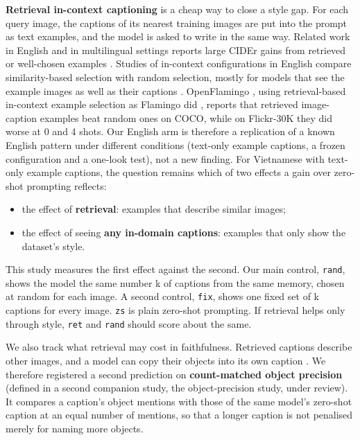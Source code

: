 \textbf{Retrieval in-context captioning} is a cheap way to close a style gap. For each query image,
the captions of its nearest training images are put into the prompt as text examples, and the model
is asked to write in the same way. Related work in English and in multilingual settings reports
large CIDEr gains from retrieved or well-chosen examples
\citep{Yang2023ICLConfig, Ramos2023LMCap, Rebelo2025RSCap}. Studies of in-context configurations in
English compare similarity-based selection with random selection, mostly for models that see the
example images as well as their captions \citep{Yang2023ICLConfig, Li2025UnveilingICL}. OpenFlamingo
\citep{Awadalla2023OpenFlamingo}, using retrieval-based in-context example selection
\citep{Yang2022PICa} as Flamingo did \citep{Alayrac2022Flamingo}, reports that retrieved
image-caption examples beat random ones on COCO, while on Flickr-30K they did worse at 0 and 4
shots. Our English arm is therefore a replication of a known English pattern under different
conditions (text-only example captions, a frozen configuration and a one-look test), not a new
finding. For Vietnamese with text-only example captions, the question remains which of two effects a
gain over zero-shot prompting reflects:

\begin{itemize}
\tightlist
\item
  the effect of \textbf{retrieval}: examples that describe similar images;
\item
  the effect of seeing \textbf{any in-domain captions}: examples that only show the dataset's style.
\end{itemize}

This study measures the first effect against the second. Our main control, \texttt{rand}, shows the
model the same number k of captions from the same memory, chosen at random for each image. A second
control, \texttt{fix}, shows one fixed set of k captions for every image. \texttt{zs} is plain
zero-shot prompting. If retrieval helps only through style, \texttt{ret} and \texttt{rand} should
score about the same.

We also track what retrieval may cost in faithfulness. Retrieved captions describe other images, and
a model can copy their objects into its own caption \citep{Li2024RetrievalRobustness}. We therefore
registered a second prediction on \textbf{count-matched object precision} (defined in a second
companion study, the object-precision study, under review). It compares a caption's object mentions
with those of the same model's zero-shot caption at an equal number of mentions, so that a longer
caption is not penalised merely for naming more objects.

